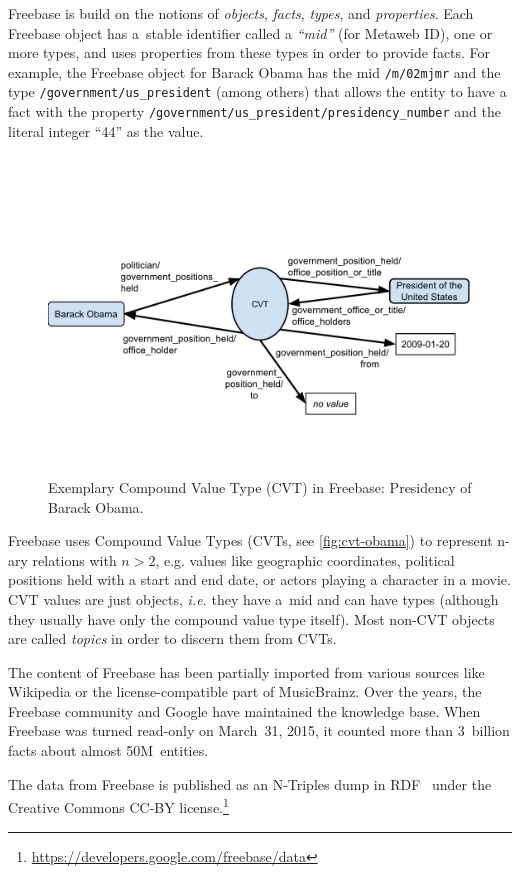 \documentclass{acm_proc_article-sp}
\begin{document}
Freebase is build on the notions of \emph{objects}, \emph{facts}, \emph{types}, and \emph{properties}.
Each Freebase object has a~stable identifier called a \emph{``mid''} (for Metaweb ID),
one or more types, and uses properties from these types in order to provide facts.
For example, the Freebase object for Barack Obama has the mid \texttt{/m/02mjmr}
and the type \texttt{/government/us\_president} (among others) that allows the entity to have
a fact with the property \texttt{/government/us\_president/presidency\_number}
and the literal integer ``44'' as the value.

\begin{figure}[!htbp]
\centering
\includegraphics[trim=0cm 3cm 0cm 5cm, width=8.45 cm]{img/freebase-cvt-obama.pdf}
\caption{Exemplary Compound Value Type (CVT) in Freebase: Presidency of Barack Obama.}
\label{fig:cvt-obama}
\end{figure}

Freebase uses Compound Value Types (CVTs, see \autoref{fig:cvt-obama}) to represent
n-ary relations with $n>2$, e.g. values like geographic coordinates,
political positions held with a start and end date, or actors playing a character in a movie.
CVT values are just objects, \emph{i.e.} they have a~mid and can have types
(although they usually have only the compound value type itself).
Most non-CVT objects are called \emph{topics} in order to discern them from CVTs.

The content of Freebase has been partially imported from various sources like Wikipedia
or the license-compatible part of MusicBrainz.
Over the years, the Freebase community and Google have maintained the knowledge base.
When Freebase was turned read-only on March~31, 2015,
it counted more than 3~billion facts about almost 50M~entities.

The data from Freebase is published as an N-Triples dump in RDF~\cite{rdf} under
the Creative Commons CC-BY license.\footnote{\url{https://developers.google.com/freebase/data}}
\end{document}
